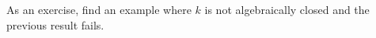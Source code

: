As an exercise, find an example where $k$ is not algebraically closed and the previous
result fails.
